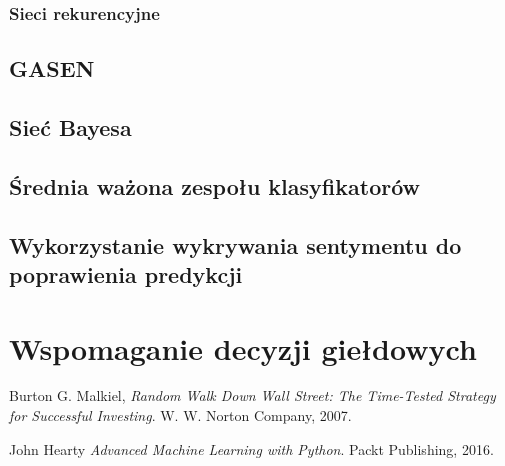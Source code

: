\documentclass[a4paper, twoside, 11pt, openright]{article}
\begin{document}
\subsubsection{Sieci rekurencyjne}

\subsection{GASEN}

\subsection{Sieć Bayesa}

\subsection{Średnia ważona zespołu klasyfikatorów}

\subsection{Wykorzystanie wykrywania sentymentu do poprawienia predykcji}

\section{Wspomaganie decyzji giełdowych}


\newpage

\renewcommand{\refname}{Bibliografia}
\begin{thebibliography}{9}
  Burton G. Malkiel,
  \textit{Random Walk Down Wall Street: The Time-Tested Strategy for Successful Investing}.
  W. W. Norton Company,
  2007.

  John Hearty
  \textit{Advanced Machine Learning with Python}.
  Packt Publishing,
  2016.


\end{thebibliography}
\end{document}
